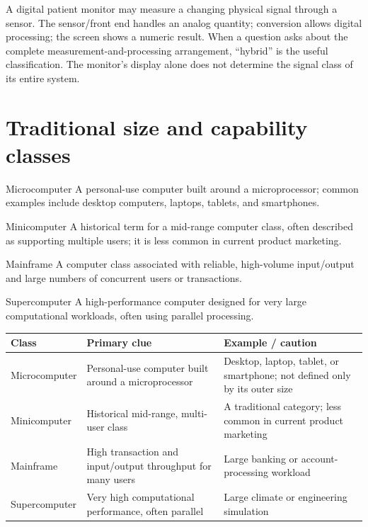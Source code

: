 \begin{example}
A digital patient monitor may measure a changing physical signal through a
sensor. The sensor/front end handles an analog quantity; conversion allows
digital processing; the screen shows a numeric result. When a question asks
about the complete measurement-and-processing arrangement, ``hybrid'' is
the useful classification. The monitor's display alone does not determine
the signal class of its entire system.
\end{example}

\section{Traditional size and capability classes}
\begin{definitionbox}{Microcomputer}
A personal-use computer built around a microprocessor; common examples
include desktop computers, laptops, tablets, and smartphones.
\end{definitionbox}

\begin{definitionbox}{Minicomputer}
A historical term for a mid-range computer class, often described as
supporting multiple users; it is less common in current product marketing.
\end{definitionbox}

\begin{definitionbox}{Mainframe}
A computer class associated with reliable, high-volume input/output and
large numbers of concurrent users or transactions.
\end{definitionbox}

\begin{definitionbox}{Supercomputer}
A high-performance computer designed for very large computational
workloads, often using parallel processing.
\end{definitionbox}

\begin{center}
\begin{tabular}{p{}p{}p{}}
\toprule
\textbf{Class} & \textbf{Primary clue} & \textbf{Example / caution}\\
\midrule
Microcomputer & Personal-use computer built around a microprocessor & Desktop, laptop, tablet, or smartphone; not defined only by its outer size\\
Minicomputer & Historical mid-range, multi-user class & A traditional category; less common in current product marketing\\
Mainframe & High transaction and input/output throughput for many users & Large banking or account-processing workload\\
Supercomputer & Very high computational performance, often parallel & Large climate or engineering simulation\\
\bottomrule
\end{tabular}
\end{center}

